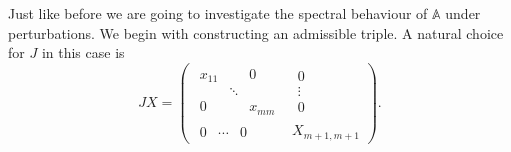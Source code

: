 \documentclass[a4paper]{jpconf}
\begin{document}
Just like before we are going to investigate
    the spectral behaviour of \( \mathbb{A} \) under perturbations.
We begin with constructing an admissible triple.
A natural choice for \( J \) in this case is
\[
        J X =
        \left(\begin{array}{c|c}
            \begin{matrix}
                x_{11} &  & 0 \\
                 & \ddots &  \\
                0 &  & x_{mm}
            \end{matrix} &
            \begin{matrix}
                0 \\
                \vdots \\
                0
            \end{matrix} \\ \hline
            \begin{matrix}
                0 & \cdots & 0
            \end{matrix} &
            X_{m+1,m+1}
        \end{array}\right).
\]
\end{document}
